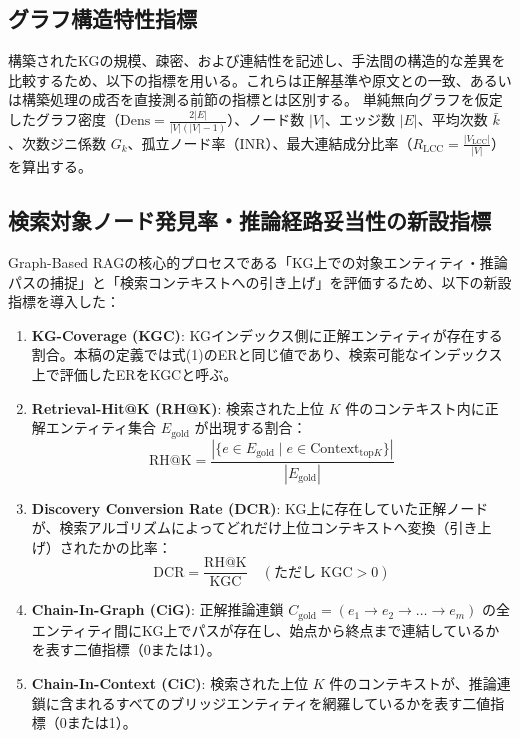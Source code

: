 \documentclass[a4j,dvipdfmx]{jsarticle}
\begin{document}
\subsection{グラフ構造特性指標}
構築されたKGの規模、疎密、および連結性を記述し、手法間の構造的な差異を比較するため、以下の指標を用いる。これらは正解基準や原文との一致、あるいは構築処理の成否を直接測る前節の指標とは区別する。
単純無向グラフを仮定したグラフ密度（$\text{Dens} = \frac{2|E|}{|V|(|V|-1)}$）、ノード数 $|V|$、エッジ数 $|E|$、平均次数 $\bar{k}$、次数ジニ係数 $G_k$、孤立ノード率（INR）、最大連結成分比率（$R_{\text{LCC}} = \frac{|V_{\text{LCC}}|}{|V|}$）を算出する。

\subsection{検索対象ノード発見率・推論経路妥当性の新設指標}
Graph-Based RAGの核心的プロセスである「KG上での対象エンティティ・推論パスの捕捉」と「検索コンテキストへの引き上げ」を評価するため、以下の新設指標を導入した：
\begin{enumerate}
    \item \textbf{KG-Coverage (KGC)}: KGインデックス側に正解エンティティが存在する割合。本稿の定義では式(1)のERと同じ値であり、検索可能なインデックス上で評価したERをKGCと呼ぶ。
    \item \textbf{Retrieval-Hit@K (RH@K)}: 検索された上位 $K$ 件のコンテキスト内に正解エンティティ集合 $E_{\text{gold}}$ が出現する割合：
    \begin{equation}
        \text{RH@K} = \frac{|\{e \in E_{\text{gold}} \mid e \in \text{Context}_{\text{top}K}\}|}{|E_{\text{gold}}|}
    \end{equation}
    \item \textbf{Discovery Conversion Rate (DCR)}: KG上に存在していた正解ノードが、検索アルゴリズムによってどれだけ上位コンテキストへ変換（引き上げ）されたかの比率：
    \begin{equation}
        \text{DCR} = \frac{\text{RH@K}}{\text{KGC}} \quad (\text{ただし } \text{KGC} > 0)
    \end{equation}
    \item \textbf{Chain-In-Graph (CiG)}: 正解推論連鎖 $C_{\text{gold}} = (e_1 \to e_2 \to \dots \to e_m)$ の全エンティティ間にKG上でパスが存在し、始点から終点まで連結しているかを表す二値指標（0または1）。
    \item \textbf{Chain-In-Context (CiC)}: 検索された上位 $K$ 件のコンテキストが、推論連鎖に含まれるすべてのブリッジエンティティを網羅しているかを表す二値指標（0または1）。
\end{enumerate}
\end{document}
